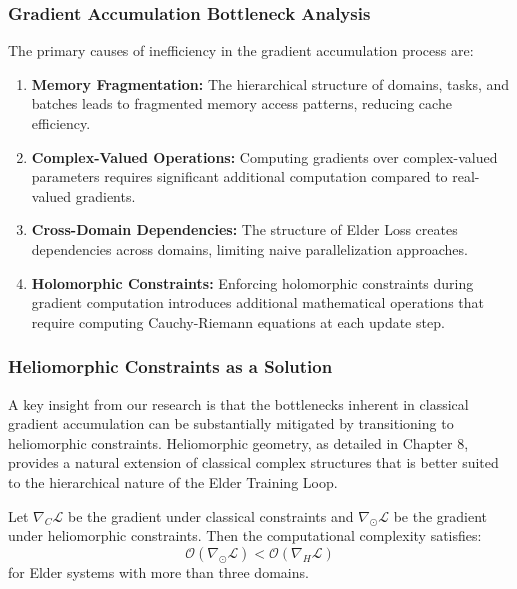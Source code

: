 \subsubsection{Gradient Accumulation Bottleneck Analysis}

The primary causes of inefficiency in the gradient accumulation process are:

\begin{enumerate}
    \item \textbf{Memory Fragmentation:} The hierarchical structure of domains, tasks, and batches leads to fragmented memory access patterns, reducing cache efficiency.
    
    \item \textbf{Complex-Valued Operations:} Computing gradients over complex-valued parameters requires significant additional computation compared to real-valued gradients.
    
    \item \textbf{Cross-Domain Dependencies:} The structure of Elder Loss creates dependencies across domains, limiting naive parallelization approaches.
    
    \item \textbf{Holomorphic Constraints:} Enforcing holomorphic constraints during gradient computation introduces additional mathematical operations that require computing Cauchy-Riemann equations at each update step.
\end{enumerate}

\subsubsection{Heliomorphic Constraints as a Solution}

A key insight from our research is that the bottlenecks inherent in classical gradient accumulation can be substantially mitigated by transitioning to heliomorphic constraints. Heliomorphic geometry, as detailed in Chapter 8, provides a natural extension of classical complex structures that is better suited to the hierarchical nature of the Elder Training Loop.

\begin{theorem}
Let $\nabla_C \mathcal{L}$ be the gradient under classical constraints and $\nabla_{\odot} \mathcal{L}$ be the gradient under heliomorphic constraints. Then the computational complexity satisfies:
\begin{equation}
\mathcal{O}(\nabla_{\odot} \mathcal{L}) < \mathcal{O}(\nabla_H \mathcal{L})
\end{equation}
for Elder systems with more than three domains.
\end{theorem}

